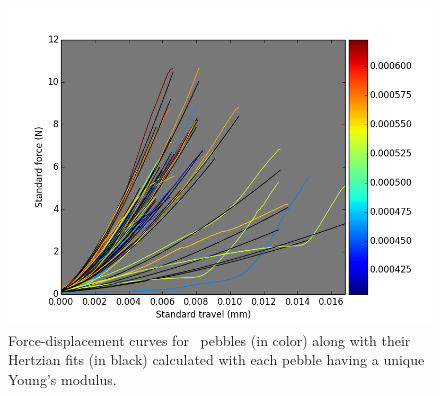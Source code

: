 \begin{figure}[!t]
\centering
    \includegraphics[width=\doubleimagewidth]{chapters/figures/fzk-hertz-colormap.png}
    \caption{Force-displacement curves for \lis~pebbles (in color) along with their Hertzian fits (in black) calculated with each pebble having a unique Young's modulus.}
    \label{fig:fzk-exp-hertz}
\end{figure}


